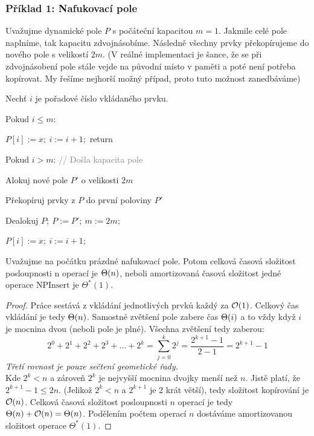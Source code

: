 \subsubsection{Příklad 1: Nafukovací pole}

Uvažujme dynamické pole $P$ s počáteční kapacitou $m = 1$. Jakmile celé pole naplníme, tak kapacitu zdvojnásobíme. Následně všechny prvky překopírujeme do nového pole s velikostí $2m$. (V reálné implementaci je šance, že se při zdvojnásobení pole stále vejde na původní místo v paměti a poté není potřeba kopírovat. My řešíme nejhorší možný případ, proto tuto možnost zanedbáváme)\bigskip

\begin{pseudocode}
\item Nechť $i$ je pořadové číslo vkládaného prvku.
\item Pokud $i \le m$:
\item \tab $P[i] := x;\ i := i + 1;$ return
\item Pokud $i > m$: \hfill \textcolor{gray}{// Došla kapacita pole}
\item \tab Alokuj nové pole $P'$ o velikosti $2m$
\item \tab Překopíruj prvky z $P$ do první poloviny $P'$
\item \tab Dealokuj $P;\ P := P';\ m := 2m;$
\item \tab $P[i] := x;\ i := i + 1;$
\end{pseudocode} \bigskip

\begin{theorem}
Uvažujme na počátku prázdné nafukovací pole. Potom celková časová složitost posloupnosti n operací je $\Theta(n)$, neboli amortizovaná časová složitost jedné operace $\text{NPInsert}$ je $\Theta^*(1)$.
\end{theorem} \bigskip

\begin{proof}
Práce sestává z vkládání jednotlivých prvků každý za $\mathcal{O}(1)$. Celkový čas vkládání je tedy $\Theta(n)$.
Samostné zvětšení pole zabere čas $\Theta(i)$ a to vždy když $i$ je mocnina dvou (neboli pole je plné).
Všechna zvětšení tedy zaberou:
$$2^0 + 2^1 + 2^2 + 2^3 + \dots + 2^k = \sum_{j=0}^{k} 2^j = \frac{2^{k+1} - 1}{2 - 1} = 2^{k+1} - 1$$
\textit{Třetí rovnost je pouze sečtení geometické řady.}\\ 

\noindent Kde $2^k < n$ a zároveň $2^k$ je nejvyšší mocnina dvojky menší než $n$.
Jistě platí, že $2^{k+1} - 1 \leq 2n$. (Jelikož $2^k < n$ a $2^{k+1}$ je 2 krát větší), tedy složitost kopírování je $\mathcal{O}(n)$.
Celková časová složitost posloupnosti $n$ operací je tedy $\Theta(n) + \mathcal{O}(n) = \Theta(n)$. Podělením počtem operací $n$ dostáváme amortizovanou složitost operace $\Theta^*(1)$.
\end{proof}

